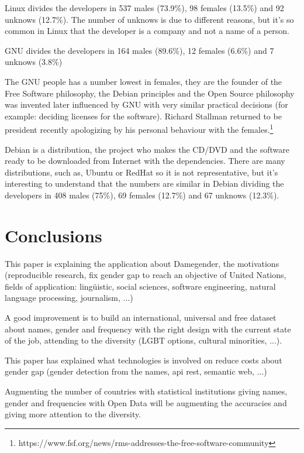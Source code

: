 \documentclass[a4paper]{article}
\begin{document}
Linux divides the developers in 537 males (73.9\%), 98 females
(13.5\%) and 92 unknows (12.7\%). The number of unknows is due to
different reasons, but it's so common in Linux that the developer is a
company and not a name of a person.

GNU divides the developers in 164 males (89.6\%), 12 females (6.6\%)
and 7 unknows (3.8\%)

The GNU people has a number lowest in females, they are the founder of
the Free Software philosophy, the Debian principles and the Open
Source philosophy was invented later influenced by GNU with very
similar practical decisions (for example: deciding licenses for the
software). Richard Stallman returned to be president recently
apologizing by his personal behaviour with the
females.\footnote{https://www.fsf.org/news/rms-addresses-the-free-software-community}

Debian is a distribution, the project who makes the CD/DVD and the
software ready to be downloaded from Internet with the
dependencies. There are many distributions, such as, Ubuntu or RedHat
so it is not representative, but it's interesting to understand that
the numbers are similar in Debian dividing the developers in 408 males
(75\%), 69 females (12.7\%) and 67 unknows (12.3\%).


\section{Conclusions}
\label{sec:conclusions}

This paper is explaining the application about Damegender, the
motivations (reproducible research, fix gender gap to reach an
objective of United Nations, fields of application: lingüistic, social
sciences, software engineering, natural language processing,
journalism, ...)

A good improvement is to build an international, universal and free
dataset about names, gender and frequency with the right design with
the current state of the job, attending to the diversity (LGBT
options, cultural minorities, ...).

This paper has explained what technologies is involved on reduce costs
about gender gap (gender detection from the names, api rest, semantic
web, ...)

Augmenting the number of countries with statistical institutions
giving names, gender and frequencies with Open Data will be augmenting
the accuracies and giving more attention to the diversity.
\end{document}

